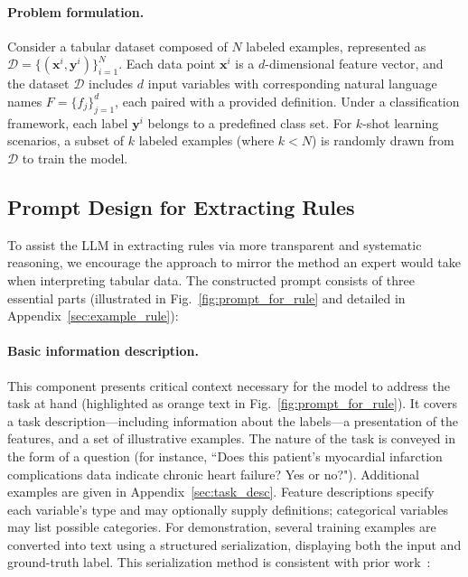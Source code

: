 \vspace*{-0.12in}
\paragraph{Problem formulation.} Consider a tabular dataset composed of $N$ labeled examples, represented as $\mathcal{D} = \{(\mathbf{x}^i, \mathbf{y}^i)\}_{i=1}^{N}$. Each data point $\mathbf{x}^i$ is a $d$-dimensional feature vector, and the dataset $\mathcal{D}$ includes $d$ input variables with corresponding natural language names $F = \{f_j\}_{j=1}^{d}$, each paired with a provided definition. Under a classification framework, each label $\mathbf{y}^i$ belongs to a predefined class set. For $k$-shot learning scenarios, a subset of $k$ labeled examples (where $k < N$) is randomly drawn from $\mathcal{D}$ to train the model.

\subsection{Prompt Design for Extracting Rules}
\label{Sec:prompt_design}
To assist the LLM in extracting rules via more transparent and systematic reasoning, we encourage the approach to mirror the method an expert would take when interpreting tabular data. The constructed prompt consists of three essential parts (illustrated in Fig.~\ref{fig:prompt_for_rule} and detailed in Appendix~\ref{sec:example_rule}):

\vspace*{-0.12in}
\paragraph{Basic information description.} This component presents critical context necessary for the model to address the task at hand (highlighted as orange text in Fig.~\ref{fig:prompt_for_rule}). It covers a task description—including information about the labels—a presentation of the features, and a set of illustrative examples. The nature of the task is conveyed in the form of a question (for instance, ``Does this patient's myocardial infarction complications data indicate chronic heart failure? Yes or no?"). Additional examples are given in Appendix~\ref{sec:task_desc}. Feature descriptions specify each variable’s type and may optionally supply definitions; categorical variables may list possible categories. For demonstration, several training examples are converted into text using a structured serialization, displaying both the input and ground-truth label. This serialization method is consistent with prior work~\cite{dinh2022lift,hegselmann2023tabllm}:

